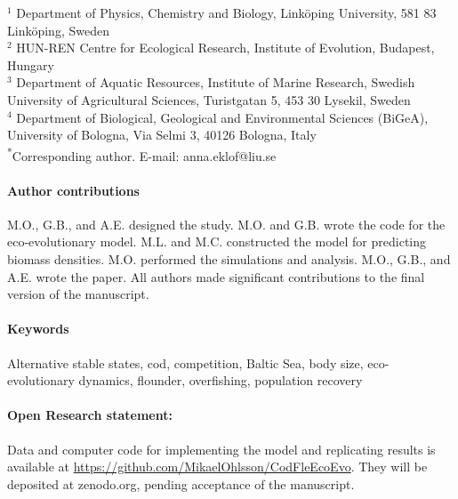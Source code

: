 \documentclass[12pt]{article}
\title{\vspace{-1.5cm}{Eco-evolutionary dynamics hinder recovery in harvested populations}}
\author{Mikael Ohlsson\textsuperscript{1},
György Barabás\textsuperscript{1,2},
Max Lindmark\textsuperscript{3},\\
Michele Casini\textsuperscript{3,4},
Viktor Thunell\textsuperscript{3},
Valerio Bartolino\textsuperscript{3},
Mattias Sköld\textsuperscript{3},
Anna Eklöf\textsuperscript{1*}}
\date{}
\begin{document}
\maketitle
    $^1$ Department of Physics, Chemistry and Biology, Linköping University, 581 83 Linköping, Sweden\\[1.2ex]%
    $^2$  HUN-REN Centre for Ecological Research, Institute of Evolution, Budapest, Hungary\\[1.2ex]
    $^3$ Department of Aquatic Resources, Institute of Marine Research, Swedish University of Agricultural Sciences,  Turistgatan 5, 453 30 Lysekil, Sweden\\[1.2ex]%
    $^4$ Department of Biological, Geological and Environmental Sciences (BiGeA), University of Bologna, Via Selmi 3, 40126 Bologna, Italy\\[1.2ex]%
    \textsuperscript{*}Corresponding author. E-mail: anna.eklof@liu.se\\[2.0ex]%

\paragraph{Author contributions} M.O., G.B., and A.E. designed the study. M.O. and G.B. wrote the code for the eco-evolutionary model. M.L. and M.C. constructed the model for predicting biomass densities. M.O. performed the simulations and analysis. M.O., G.B., and A.E. wrote the paper. All authors made significant contributions to the final version of the manuscript.

\paragraph{Keywords}
Alternative stable states, cod, competition, Baltic Sea, body size, eco-evolutionary dynamics, flounder, overfishing, population recovery



\paragraph{Open Research statement:} Data and computer code for implementing the model and replicating results is available at \url{https://github.com/MikaelOhlsson/CodFleEcoEvo}. They will be deposited at zenodo.org, pending acceptance of the manuscript.

\clearpage
\doublespacing
\end{document}
